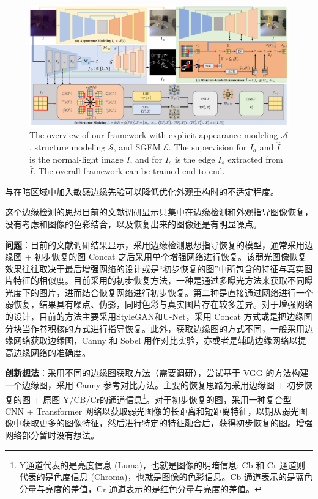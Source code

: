 \documentclass[letterpaper,10pt]{article}
\begin{document}
		\begin{figure}[htbp]
			\centering 
			\includegraphics[width=\columnwidth]{picture/LLIE/Overview}
			\caption{
				\label{fig: Overview} 
				The overview of our framework with explicit appearance modeling $\mathcal{A}$, structure modeling $\mathcal{S}$, and SGEM $\mathcal{E}$. The supervision for $I_a$ and $\widehat{I}$ is the normal-light image $\bar{I}$, and for $I_s$ is the edge $\bar{I}_s$ extracted from $\bar{I}$. The overall framework can be trained end-to-end.
			}
		\end{figure}
		
		\cite{rana2021edge}与\cite{zhu2020eemefn}在暗区域中加入敏感边缘先验可以降低优化外观重构时的不适定程度。

		这个边缘检测的思想目前的文献调研显示只集中在边缘检测和外观指导图像恢复，没有考虑和图像的色彩结合，以及恢复出来的图像还是有明显噪点。
		
		\textbf{问题}：目前的文献调研结果显示，采用边缘检测思想指导恢复的模型，通常采用边缘图 + 初步恢复的图 Concat 之后采用单个增强网络进行恢复。该弱光图像恢复效果往往取决于最后增强网络的设计或是“初步恢复的图”中所包含的特征与真实图片特征的相似度。目前采用的初步恢复方法，一种是通过多曝光方法来获取不同曝光度下的图片，进而结合恢复网络进行初步恢复。第二种是直接通过网络进行一个弱恢复，结果具有噪点、伪影，同时色彩与真实图片存在较多差异。对于增强网络的设计，目前的方法主要采用StyleGAN和U-Net，采用 Concat 方式或是把边缘图分块当作卷积核的方式进行指导恢复。此外，获取边缘图的方式不同，一般采用边缘网络获取边缘图，Canny 和 Sobel 用作对比实验，亦或者是辅助边缘网络以提高边缘网络的准确度。
		
		\textbf{创新想法}：采用不同的边缘图获取方法（需要调研），尝试基于 VGG 的方法构建一个边缘图，采用 Canny 参考对比方法。主要的恢复思路为采用边缘图 + 初步恢复的图 + 原图 Y/CB/Cr的通道信息\footnote{Y通道代表的是亮度信息 (Luma)，也就是图像的明暗信息; Cb 和 Cr 通道则代表的是色度信息 (Chroma)，也就是图像的色彩信息。Cb 通道表示的是蓝色分量与亮度的差值，Cr 通道表示的是红色分量与亮度的差值。}。对于初步恢复的图，采用一种复合型 CNN + Transformer 网络以获取弱光图像的长距离和短距离特征，以期从弱光图像中获取更多的图像特征，然后进行特定的特征融合后，获得初步恢复的图。增强网络部分暂时没有想法。
		
\end{document}
